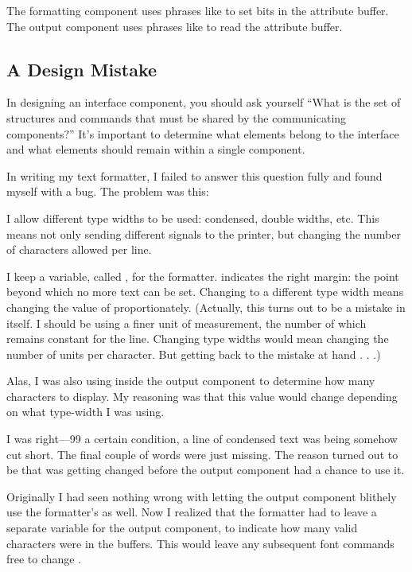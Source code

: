 The formatting component uses phrases like 
to set bits in the attribute buffer. The output component uses phrases
like  to read the attribute buffer.

\subsection{A Design Mistake}

In designing an interface component, you should ask yourself ``What is
the set of structures and commands that must be shared by the
communicating components?'' It's important to determine what elements
belong to the interface and what elements should remain within a
single component.

In writing my text formatter, I failed to answer this question fully
and found myself with a bug. The problem was this:

I allow different type widths to be used: condensed, double widths,
etc. This means not only sending different signals to the printer, but
changing the number of characters allowed per line.

I keep a variable, called , for the formatter.  indicates
the right margin: the point beyond which no more text can be set. Changing
to a different type width means changing the value of  proportionately.
(Actually, this turns out to be a mistake in itself. I should be
using a finer unit of measurement, the number of which remains constant
for the line. Changing type widths would mean changing the number of
units per character. But getting back to the mistake at hand . . .)

Alas, I was also using  inside the output component to determine
how many characters to display. My reasoning was that this value would
change depending on what type-width I was using.

I was right---99%
a certain condition, a line of condensed text was being somehow cut
short. The final couple of words were just missing. The reason turned out
to be that  was getting changed before the output component had
a chance to use it.

Originally I had seen nothing wrong with letting the output component
blithely use the formatter's  as well. Now I realized that the
formatter had to leave a separate variable for the output component,
to indicate how many valid characters were in the buffers. This would
leave any subsequent font commands free to change .

